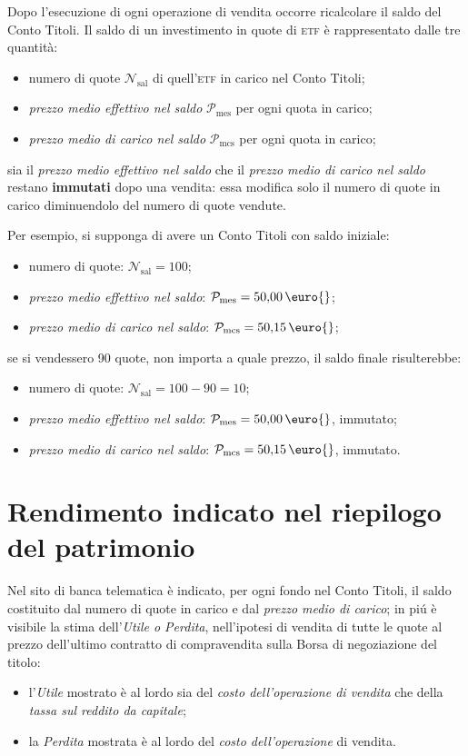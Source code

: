 \documentclass[12pt,a4paper]{article}
\newcommand{\Eur}[1]{\qty{#1}{\text{\euro{}}}}
\newcommand{\Etf}[1]{\textsc{etf}}
\newcommand{\Nsal}[1]{\mathcal{N}_{\textrm{sal}#1}}
\newcommand{\Pme}[1]{\mathcal{P}_{\mathrm{me}#1}}
\newcommand{\Pmes}[1]{\Pme{\mathrm{s}#1}}
\newcommand{\Pmc}[1]{\mathcal{P}_{\mathrm{mc}#1}}
\newcommand{\Pmcs}[1]{\Pmc{\mathrm{s}#1}}
\begin{document}
Dopo l'esecuzione di ogni  operazione di vendita occorre ricalcolare il saldo  del Conto Titoli.  Il
saldo di un investimento in quote di \Etf{} è rappresentato dalle tre quantità:
\begin{itemize}
\item numero di quote \(\Nsal{}\) di quell'\Etf{} in carico nel Conto Titoli;
\item \emph{prezzo medio effettivo nel saldo} \(\Pmes{}\) per ogni quota in carico;
\item \emph{prezzo medio di carico nel saldo} \(\Pmcs{}\) per ogni quota in carico;
\end{itemize}
sia  il \emph{prezzo  medio effettivo  nel saldo}  che il  \emph{prezzo medio  di carico  nel saldo}
restano  \textbf{immutati} dopo  una  vendita: essa  modifica  solo  il numero  di  quote in  carico
diminuendolo del numero di quote vendute.

Per esempio, si supponga di avere un Conto Titoli con saldo iniziale:
\begin{itemize}
\item numero di quote: \(\Nsal{} = \num{100}\);
\item \emph{prezzo medio effettivo nel saldo}: \(\Pmes{} = \Eur{50,00}\);
\item \emph{prezzo medio di carico nel saldo}: \(\Pmcs{} = \Eur{50,15}\);
\end{itemize}
se si vendessero \num{90} quote, non importa a quale prezzo, il saldo finale risulterebbe:
\begin{itemize}
\item numero di quote: \(\Nsal{} = \num{100} - \num{90} = \num{10}\);
\item \emph{prezzo medio effettivo nel saldo}: \(\Pmes{} = \Eur{50,00}\), immutato;
\item \emph{prezzo medio di carico nel saldo}: \(\Pmcs{} = \Eur{50,15}\), immutato.
\end{itemize}


\section{Rendimento indicato nel riepilogo del patrimonio}


Nel sito di  banca telematica è indicato, per  ogni fondo nel Conto Titoli, il  saldo costituito dal
numero  di quote  in  carico e  dal  \emph{prezzo  medio di  carico};  in piú  è  visibile la  stima
dell'\emph{Utile  o Perdita},  nell'ipotesi  di vendita  di  tutte le  quote  al prezzo  dell'ultimo
contratto di compravendita sulla Borsa di negoziazione del titolo:
\begin{itemize}
\item l'\emph{Utile} mostrato è  al lordo sia del \emph{costo dell'operazione  di vendita} che della
  \emph{tassa sul reddito da capitale};
\item la \emph{Perdita} mostrata è al lordo del \emph{costo dell'operazione} di vendita.
\end{itemize}
\end{document}
